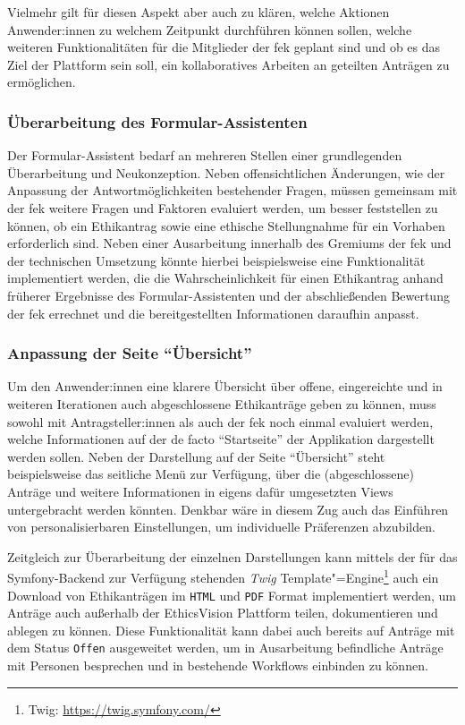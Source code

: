 \documentclass[a4paper,12pt,twoside,numbers=noendperiod]{scrreprt}
\begin{document}
Vielmehr gilt für diesen Aspekt aber auch zu klären, welche Aktionen Anwender:innen zu welchem Zeitpunkt durchführen können sollen, welche weiteren Funktionalitäten für die Mitglieder der \acl{fek} geplant sind und ob es das Ziel der Plattform sein soll, ein kollaboratives Arbeiten an geteilten Anträgen zu ermöglichen.

\subsubsection*{Überarbeitung des Formular-Assistenten}
\label{sub-sub-sec:überarbeitung-formular-assistent}

Der Formular-Assistent bedarf an mehreren Stellen einer grundlegenden Überarbeitung und Neukonzeption. Neben offensichtlichen Änderungen, wie der Anpassung der Antwortmöglichkeiten bestehender Fragen, müssen gemeinsam mit der \ac{fek} weitere Fragen und Faktoren evaluiert werden, um besser feststellen zu können, ob ein Ethikantrag sowie eine ethische Stellungnahme für ein Vorhaben erforderlich sind. Neben einer Ausarbeitung innerhalb des Gremiums der \ac{fek} und der technischen Umsetzung könnte hierbei beispielsweise eine Funktionalität implementiert werden, die die Wahrscheinlichkeit für einen Ethikantrag anhand früherer Ergebnisse des Formular-Assistenten und der abschließenden Bewertung der \ac{fek} errechnet und die bereitgestellten Informationen daraufhin anpasst.

\subsubsection*{Anpassung der Seite \enquote{Übersicht}}
\label{sub-sub-sec:anpassung-seite-übersicht}

Um den Anwender:innen eine klarere Übersicht über offene, eingereichte und in weiteren Iterationen auch abgeschlossene Ethikanträge geben zu können, muss sowohl mit Antragsteller:innen als auch der \ac{fek} noch einmal evaluiert werden, welche Informationen auf der de facto \enquote{Startseite} der Applikation dargestellt werden sollen. Neben der Darstellung auf der Seite \enquote{Übersicht} steht beispielsweise das seitliche Menü zur Verfügung, über die (abgeschlossene) Anträge und weitere Informationen in eigens dafür umgesetzten Views untergebracht werden könnten. Denkbar wäre in diesem Zug auch das Einführen von personalisierbaren Einstellungen, um individuelle Präferenzen abzubilden.

\medskip

Zeitgleich zur Überarbeitung der einzelnen Darstellungen kann mittels der für das Symfony-Backend zur Verfügung stehenden \textit{Twig} Template"=Engine\footnote{Twig: \url{https://twig.symfony.com/}} auch ein Download von Ethikanträgen im \texttt{HTML} und \texttt{PDF} Format implementiert werden, um Anträge auch außerhalb der EthicsVision Plattform teilen, dokumentieren und ablegen zu können. Diese Funktionalität kann dabei auch bereits auf Anträge mit dem Status \texttt{Offen} ausgeweitet werden, um in Ausarbeitung befindliche Anträge mit Personen besprechen und in bestehende Workflows einbinden zu können.
\end{document}
